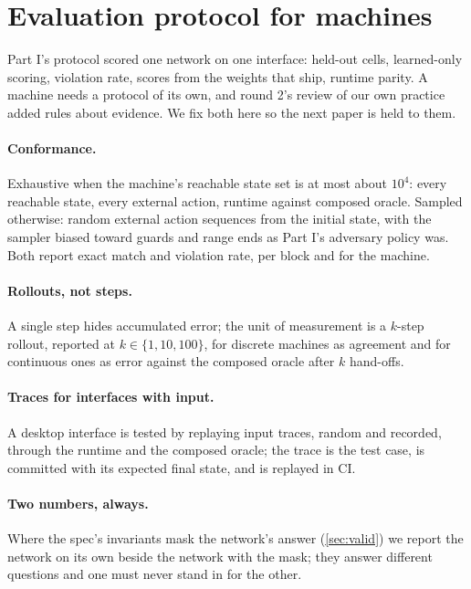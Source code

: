 \section{Evaluation protocol for machines}
\label{sec:protocol}

Part I's protocol scored one network on one interface: held-out cells, learned-only scoring, violation rate,
scores from the weights that ship, runtime parity. A machine needs a protocol of its own, and round 2's review
of our own practice added rules about evidence. We fix both here so the next paper is held to them.

\paragraph{Conformance.} Exhaustive when the machine's reachable state set is at most about $10^4$: every
reachable state, every external action, runtime against composed oracle. Sampled otherwise: random external
action sequences from the initial state, with the sampler biased toward guards and range ends as Part I's
adversary policy was. Both report exact match and violation rate, per block and for the machine.

\paragraph{Rollouts, not steps.} A single step hides accumulated error; the unit of measurement is a
$k$-step rollout, reported at $k\in\{1,10,100\}$, for discrete machines as agreement and for continuous ones as
error against the composed oracle after $k$ hand-offs.

\paragraph{Traces for interfaces with input.} A desktop interface is tested by replaying input traces, random
and recorded, through the runtime and the composed oracle; the trace is the test case, is committed with its
expected final state, and is replayed in CI.

\paragraph{Two numbers, always.} Where the spec's invariants mask the network's answer
(\cref{sec:valid}) we report the network on its own beside the network with the mask; they answer different
questions and one must never stand in for the other.

